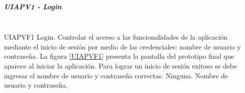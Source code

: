 \subparagraph{UIAPV1 - Login} ~\\

{UIAPVF1} %
{Login.}  %
{Controlar el acceso a las funcionalidades de la aplicación mediante el inicio de sesión por medio de las credenciales: nombre de usuario y contraseña.} %
{La figura \ref{UIAPVF1} presenta la pantalla del prototipo final que aparece al iniciar la aplicación. Para lograr un inicio de sesión exitoso se debe ingresar el nombre de usuario y contraseña correctas.} %
{Ninguna.} %
{Nombre de usuario y contraseña.} %





